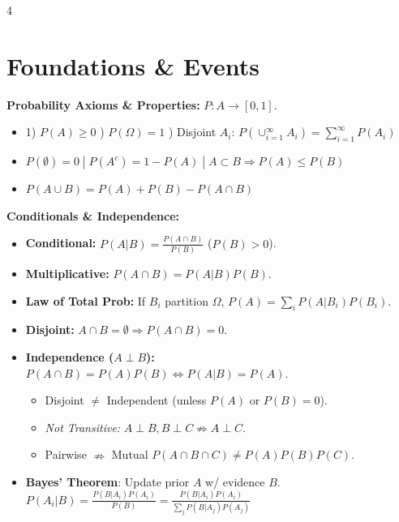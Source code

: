 \documentclass[9pt]{extarticle}
\begin{document}
\begin{multicols*}{4}

 
\section*{Foundations \& Events}
 
\textbf{Probability Axioms \& Properties:} $P: A \to [0,1]$.
\begin{itemize}
    \item 1) $P(A) \ge 0$ ) $P(\Omega) = 1$ ) Disjoint $A_i$: $P(\cup_{i=1}^{\infty}A_i) = \sum_{i=1}^{\infty}P(A_i)$
    \item $P(\emptyset) = 0 \;|\; P(A^c) = 1 - P(A) \;|\; A \subset B \Rightarrow P(A) \le P(B)$
    \item $P(A \cup B) = P(A) + P(B) - P(A \cap B)$
\end{itemize}
 
\textbf{Conditionals \& Independence:}
\begin{itemize}
    \item \textbf{Conditional:} $P(A|B) = \frac{P(A \cap B)}{P(B)}$ ($P(B)>0$).
    \item \textbf{Multiplicative:} $P(A \cap B) = P(A|B)P(B)$. 
    \item \textbf{Law of Total Prob:} If $B_i$ partition $\Omega$, $P(A) = \sum_{i} P(A|B_i)P(B_i)$.
    \item \textbf{Disjoint:} $A \cap B = \emptyset \Rightarrow P(A \cap B) = 0$.
    \item \textbf{Independence ($A \perp B$):} $P(A \cap B) = P(A)P(B) \iff P(A|B) = P(A)$.
    \begin{itemize}
        \item Disjoint $\neq$ Independent (unless $P(A)$ or $P(B) = 0$).
        \item \textit{Not Transitive:} $A\perp B, B\perp C \nRightarrow A\perp C$.
        \item Pairwise $\nRightarrow$ Mutual $P(A{\cap}B{\cap}C) \neq P(A)P(B)P(C)$.
    \end{itemize}
    \item \textbf{Bayes' Theorem}: Update prior $A$ w/ evidence $B$.\\
    $P(A_i|B) = \frac{P(B|A_i)P(A_i)}{P(B)} = \frac{P(B|A_i)P(A_i)}{\sum_j P(B|A_j)P(A_j)}$
\end{itemize}


\end{multicols*}
\end{document}
